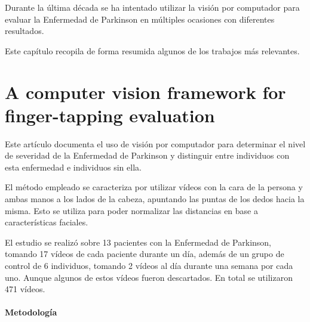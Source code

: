 \label{cha:Trabajos relacionados}

Durante la última década se ha intentado utilizar la visión por computador para
evaluar la Enfermedad de Parkinson en múltiples ocasiones con diferentes
resultados.

Este capítulo recopila de forma resumida algunos de los trabajos más relevantes.


\section{A computer vision framework for finger-tapping evaluation}

Este artículo \cite{khan2014computer} documenta el uso de visión por computador
para determinar el nivel de severidad de la Enfermedad de Parkinson y distinguir
entre individuos con esta enfermedad e individuos sin ella.

El método empleado se caracteriza por utilizar vídeos con la cara de la persona
y ambas manos a los lados de la cabeza, apuntando las puntas de los dedos hacia
la misma. Esto se utiliza para poder normalizar las distancias en base a
características faciales.

El estudio se realizó sobre 13 pacientes con la Enfermedad de Parkinson, tomando
17 vídeos de cada paciente durante un día, además de un grupo de control de 6
individuos, tomando 2 vídeos al día durante una semana por cada uno. Aunque
algunos de estos vídeos fueron descartados. En total se utilizaron 471 vídeos.


\paragraph{Metodología}

